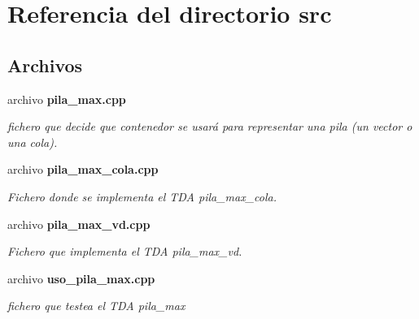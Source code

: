 \section{Referencia del directorio src}
\label{dir_68267d1309a1af8e8297ef4c3efbcdba}
\subsection*{Archivos}
\begin{DoxyCompactItemize}
\item 
archivo {\bf pila\+\_\+max.\+cpp}
\begin{DoxyCompactList}\small\item\em fichero que decide que contenedor se usará para representar una pila (un vector o una cola). \end{DoxyCompactList}\item 
archivo {\bf pila\+\_\+max\+\_\+cola.\+cpp}
\begin{DoxyCompactList}\small\item\em Fichero donde se implementa el T\+DA pila\+\_\+max\+\_\+cola. \end{DoxyCompactList}\item 
archivo {\bf pila\+\_\+max\+\_\+vd.\+cpp}
\begin{DoxyCompactList}\small\item\em Fichero que implementa el T\+DA pila\+\_\+max\+\_\+vd. \end{DoxyCompactList}\item 
archivo {\bf uso\+\_\+pila\+\_\+max.\+cpp}
\begin{DoxyCompactList}\small\item\em fichero que testea el T\+DA pila\+\_\+max \end{DoxyCompactList}\end{DoxyCompactItemize}
